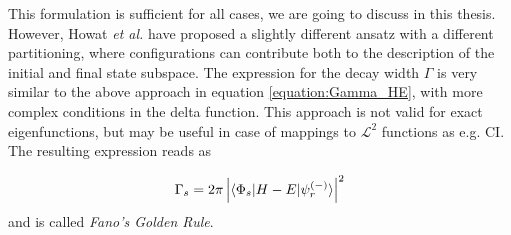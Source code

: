 This formulation is sufficient for all cases, we are going to discuss in this thesis.
However, Howat \textit{et al.} have proposed a slightly different ansatz with
a different partitioning, where configurations can contribute both to the description
of the initial and final state subspace. The expression for the decay width $\Gamma$
is very similar to the above approach in equation \ref{equation:Gamma_HE}, with more
complex conditions in the delta function.\cite{Howat78} This approach is not valid for exact
eigenfunctions, but may be useful in case of mappings to $\mathcal{L}^2$ functions as
e.g. \ac{CI}. The resulting expression reads as

\begin{equation}
  \Gamma_s = 2 \pi \left| \braket{\Phi_s|H-E|\psi_r^{(-)}} \right| ^2
\end{equation}
and is called \emph{Fano's Golden Rule}.
